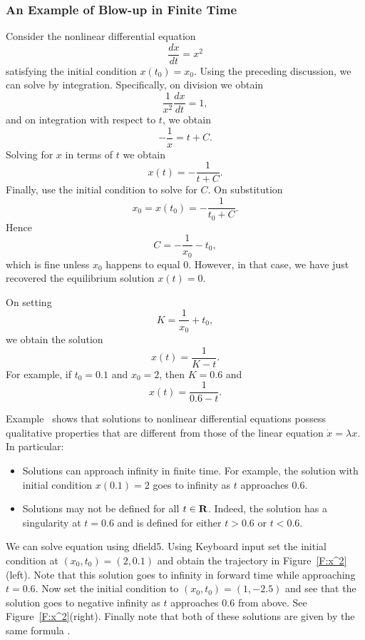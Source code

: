 \subsubsection*{An Example of Blow-up in Finite Time}

Consider the nonlinear differential equation
\begin{equation}  \label{e:x^2}
\frac{dx}{dt} = x^2
\end{equation}
satisfying the initial condition $x(t_0)=x_0$.  Using the preceding 
discussion, we can solve  by integration.  Specifically,
on division we obtain
\[
\frac{1}{x^2}\frac{dx}{dt} = 1,
\]
and on integration with respect to $t$, we obtain
\[
-\frac{1}{x} = t + C.
\]
Solving for $x$ in terms of $t$ we obtain
\[
x(t) = - \frac{1}{t+C}.
\]
Finally, use the initial condition to solve for $C$. On substitution 
\[
x_0 = x(t_0) = - \frac{1}{t_0+C}.
\]
Hence
\[
C = -\frac{1}{x_0} - t_0,
\]
which is fine unless $x_0$ happens to equal $0$.  However, in that case, we 
have just recovered the equilibrium solution $x(t)=0$.

On setting
\[
K = \frac{1}{x_0}+t_0,
\]
we obtain the solution
\[
x(t) =  \frac{1}{K-t}.
\]
For example, if $t_0=0.1$ and $x_0=2$, then $K=0.6$ and
\begin{equation} \label{E:solnx^2}
x(t) = \frac{1}{0.6-t}.
\end{equation}

Example~ shows that solutions to nonlinear differential
equations possess 
qualitative properties that are different from 
those of the linear equation $\dot{x}=\lambda x$.  In particular:
\begin{itemize}
\item Solutions can approach infinity in finite time.   For example, 
the solution  with initial condition $x(0.1)=2$ goes to 
infinity as $t$ approaches $0.6$.   
\item Solutions may not be defined for all $t\in\mbox{$\bf{R}$}$.  Indeed, the 
solution  has a singularity at $t=0.6$ and is defined 
for either $t> 0.6$ or $t<0.6$.  
\end{itemize}


We can solve equation  using 
{\sf dfield5}.
Using {\sf Keyboard input} set the initial condition at
$(x_0,t_0)=(2,0.1)$ and obtain the trajectory in
Figure~\ref{F:x^2}(left).  Note that this solution goes to infinity
in forward time while approaching $t=0.6$.  Now set the initial
condition to $(x_0,t_0)=(1,-2.5)$ and see that the solution goes
to negative infinity as $t$ approaches $0.6$ from above.  See
Figure~\ref{F:x^2}(right).  Finally note that both of these
solutions are given by the same formula .

